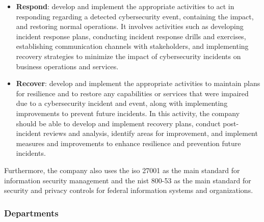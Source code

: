 \begin{multicols}{2}
\begin{itemize}
            \item \textbf{Respond}: develop and implement the appropriate activities to act in responding
                  regarding a detected cybersecurity event, containing the impact, and restoring normal operations.
                  It involves activities such as developing incident response plans, conducting incident response
                  drills and exercises, establishing communication channels with stakeholders, and implementing
                  recovery strategies to minimize the impact of cybersecurity incidents on business operations and
                  services.
            \item \textbf{Recover}: develop and implement the appropriate activities to maintain plans for
                  resilience and to restore any capabilities or services that were impaired due to a cybersecurity
                  incident and event, along with implementing improvements to prevent future incidents. In this
                  activity,  the company should be able to develop and implement recovery plans, conduct
                  post-incident reviews and analysis, identify areas for improvement, and implement measures and
                  improvements to enhance resilience and prevention future incidents.
      \end{itemize}
      Furthermore, the company also uses the \acrshort{iso} 27001 as the main standard for information security
      management and the \acrshort{nist} 800-53 as the main standard for security and privacy controls for federal
      information systems and organizations.

      \subsubsection{Departments}


\end{multicols}
